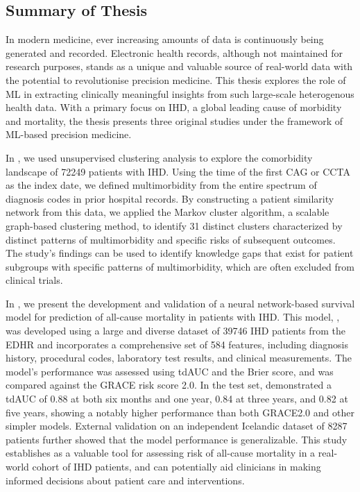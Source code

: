 \begin{@empty}
    
\chapter{Summary of Thesis}
\setlength{\parskip}{6pt}

In modern medicine, 
ever increasing amounts of data 
is continuously being generated and recorded. 
Electronic health records,
although not maintained for research purposes,
stands as a unique and valuable source of real-world data
with the potential to revolutionise precision medicine.
This thesis explores the role of \ac{ML} in extracting 
clinically meaningful insights from such large-scale heterogenous health data.
With a primary focus on \ac{IHD},
a global leading cause of morbidity and mortality, 
the thesis presents three original studies 
under the framework of \ac{ML}-based precision medicine.

In \studyi{}, 
we used unsupervised clustering analysis to explore the comorbidity landscape
of \num{72249} patients with \ac{IHD}.
Using the time of the first \acl{CAG} or \acl{CCTA} as the index date,
we defined multimorbidity from the entire spectrum of diagnosis codes
in prior hospital records.
By constructing a patient similarity network from this data, 
we applied the Markov cluster algorithm,
a scalable graph-based clustering method, 
to identify \num{31} distinct clusters 
characterized by distinct patterns of multimorbidity 
and specific risks of subsequent outcomes.
The study's findings can be used to identify knowledge gaps that exist for 
patient subgroups with specific patterns of multimorbidity, 
which are often excluded from clinical trials.

In \studyii{}, 
we present the development and validation of 
a neural network-based survival model
for prediction of all-cause mortality in patients with \ac{IHD}.
This model, , was 
developed using a large and diverse dataset of 
\num{39746} \ac{IHD} patients from the \ac{EDHR}
and incorporates a comprehensive set of 584 features,
including diagnosis history, procedural codes, laboratory test results,
and clinical measurements.
The model's performance was assessed using \ac{tdAUC} and the Brier score, 
and was compared against the \acs{GRACE} risk score 2.0. 
In the test set,  demonstrated a \ac{tdAUC} of 0.88 at both six months and one
year, 0.84 at three years, and 0.82 at five years, showing a notably higher
performance than both GRACE2.0 and other simpler models.
External validation on an independent Icelandic dataset of \num{8287} patients 
further showed that the model performance is generalizable.
This study establishes  as a valuable tool for assessing
risk of all-cause mortality in a real-world cohort of \ac{IHD} patients,
and can potentially aid clinicians in making informed decisions 
about patient care and interventions.


\end{@empty}
